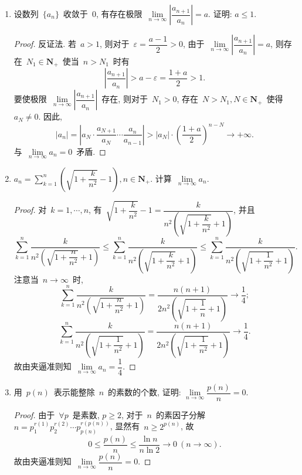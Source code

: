 \documentclass[UTF8,a4paper,11pt,twoside]{book}
\begin{document}
\begin{enumerate}
	\item 设数列~$\{a_n\}$~收敛于~$0$, 有存在极限~$\lim\limits_{n\to\infty} \left|\dfrac{a_{n+1}}{a_n}\right|=a$. 证明: $a\leqslant 1$.
	      \begin{proof}
		      反证法. 若~$a>1$, 则对于~$\varepsilon=\dfrac{a-1}{2}>0$, 由于~$\lim\limits_{n\to\infty} \left|\dfrac{a_{n+1}}{a_n}\right|=a$, 则存在~$N_1\in\mathbf{N}_{+}$~使当~$n>N_1$~时有
		      \[
			      \left|\dfrac{a_{n+1}}{a_n}\right|>a-\varepsilon=\dfrac{1+a}{2}>1.
		      \]
		      要使极限~$\lim\limits_{n\to\infty} \left|\dfrac{a_{n+1}}{a_n}\right|$~存在, 则对于~$N_1>0$, 存在~$N>N_1, N\in\mathbf{N}_{+}$~使得~$a_{N}\neq 0$. 因此,
		      \[
			      |a_n|=\left|a_N\cdot\dfrac{a_{N+1}}{a_{N}}\cdots\dfrac{a_n}{a_{n-1}}\right|>|a_N|\cdot\left(\dfrac{1+a}{2}\right)^{n-N}\to+\infty.
		      \]
		      与~$\lim\limits_{n\to\infty} a_n=0$~矛盾. \qedhere
	      \end{proof}

	\item $a_n=\displaystyle\sum\limits_{k=1}^n\left(\sqrt{1+\dfrac{k}{n^2}}-1\right), n\in\mathbf{N}_{+}$. 计算~$\lim\limits_{n\to\infty} a_n$.
	      \begin{proof}
		      对~$k=1,\cdots, n$, 有~$\sqrt{1+\dfrac{k}{n^2}}-1=\dfrac{k}{n^2\left(\sqrt{1+\dfrac{k}{n^2}}+1\right)}$, 并且
		      \[
			      \sum_{k=1}^{n} \dfrac{k}{n^2\left(\sqrt{1+\dfrac{n}{n^2}}+1\right)}\leqslant \sum_{k=1}^{n} \dfrac{k}{n^2\left(\sqrt{1+\dfrac{k}{n^2}}+1\right)}\leqslant \sum_{k=1}^{n} \dfrac{k}{n^2\left(\sqrt{1+\dfrac{1}{n^2}}+1\right)}.
		      \]
		      注意当~$n\to\infty$~时,
		      \[
			      \sum_{k=1}^{n} \dfrac{k}{n^2\left(\sqrt{1+\dfrac{n}{n^2}}+1\right)}=\dfrac{n(n+1)}{2n^2\left(\sqrt{1+\dfrac{1}{n}}+1\right)}\to\dfrac{1}{4};
		      \]
		      \[
			      \sum_{k=1}^{n} \dfrac{k}{n^2\left(\sqrt{1+\dfrac{1}{n^2}}+1\right)}=\dfrac{n(n+1)}{2n^2\left(\sqrt{1+\dfrac{1}{n^2}}+1\right)}\to\dfrac{1}{4}.
		      \]
		      故由夹逼准则知~$\lim\limits_{n\to\infty} a_n=\dfrac{1}{4}$. \qedhere
	      \end{proof}

	\item 用~$p(n)$~表示能整除~$n$~的素数的个数, 证明: $\lim\limits_{n\to\infty} \dfrac{p(n)}{n}=0$.
	      \begin{proof}
		      由于~$\forall p$~是素数, $p\geqslant 2$, 对于~$n$~的素因子分解~$n=p_1^{r(1)}p_2^{r(2)}\cdots p_{p(n)}^{r(p(n))}$, 显然有~$n\geqslant 2^{p(n)}$, 故
		      \[
			      0\leqslant\dfrac{p(n)}{n}\leqslant\dfrac{\ln{n}}{n\ln{2}}\to 0\ (n\to\infty).
		      \]
		      故由夹逼准则知~$\lim\limits_{n\to\infty} \dfrac{p(n)}{n}=0$.\qedhere
	      \end{proof}


\end{enumerate}
\end{document}
